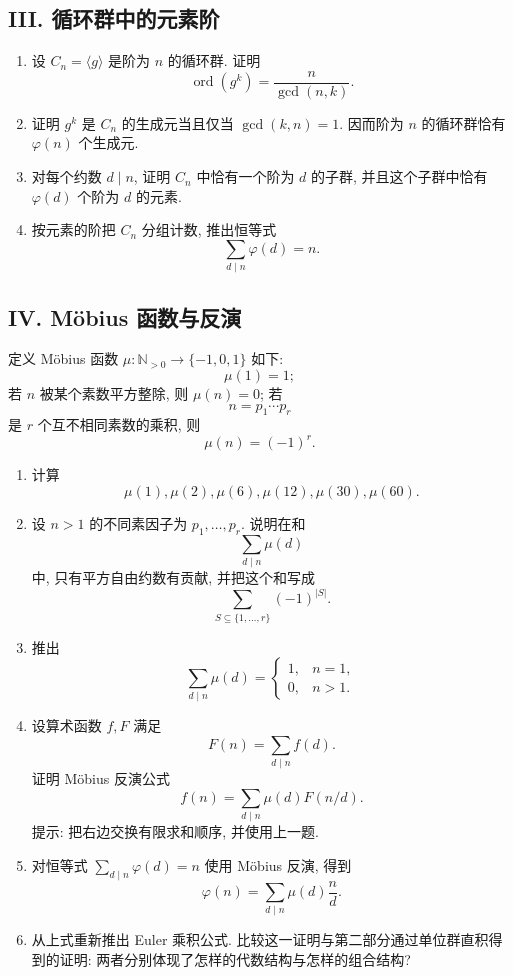 \documentclass[usesamecnt, thmcnt=section, lang=cn, newtx, 10pt, scheme=chinese]{elegantbook}
\begin{document}
\subsection*{III. 循环群中的元素阶}
\begin{enumerate}[label=\textbf{\arabic*.}, resume=alg-comp]
  \item 设 $C_n=\langle g\rangle$ 是阶为 $n$ 的循环群. 证明
  \[
   \operatorname{ord}(g^k)=\frac{n}{\gcd(n,k)}.
  \]
  \item 证明 $g^k$ 是 $C_n$ 的生成元当且仅当 $\gcd(k,n)=1$. 因而阶为 $n$ 的循环群恰有 $\varphi(n)$ 个生成元.
  \item 对每个约数 $d\mid n$, 证明 $C_n$ 中恰有一个阶为 $d$ 的子群, 并且这个子群中恰有 $\varphi(d)$ 个阶为 $d$ 的元素.
  \item 按元素的阶把 $C_n$ 分组计数, 推出恒等式
  \[
   \sum_{d\mid n}\varphi(d)=n.
  \]
\end{enumerate}

\subsection*{IV. Möbius 函数与反演}

定义 Möbius 函数 $\mu:\mathbb N_{>0}\to\{-1,0,1\}$ 如下:
\[
 \mu(1)=1;
\]
若 $n$ 被某个素数平方整除, 则 $\mu(n)=0$; 若
\[
 n=p_1\cdots p_r
\]
是 $r$ 个互不相同素数的乘积, 则
\[
 \mu(n)=(-1)^r.
\]

\begin{enumerate}[label=\textbf{\arabic*.}, resume=alg-comp]
  \item 计算
  \[
   \mu(1),\mu(2),\mu(6),\mu(12),\mu(30),\mu(60).
  \]
  \item 设 $n>1$ 的不同素因子为 $p_1,\ldots,p_r$. 说明在和
  \[
   \sum_{d\mid n}\mu(d)
  \]
  中, 只有平方自由约数有贡献, 并把这个和写成
  \[
   \sum_{S\subseteq\{1,\ldots,r\}}(-1)^{|S|}.
  \]
  \item 推出
  \[
   \sum_{d\mid n}\mu(d)
   =\begin{cases}
   1,&n=1,\\
   0,&n>1.
   \end{cases}
  \]
  \item 设算术函数 $f,F$ 满足
  \[
   F(n)=\sum_{d\mid n}f(d).
  \]
  证明 Möbius 反演公式
  \[
   f(n)=\sum_{d\mid n}\mu(d)F(n/d).
  \]
  提示: 把右边交换有限求和顺序, 并使用上一题.
  \item 对恒等式 $\sum_{d\mid n}\varphi(d)=n$ 使用 Möbius 反演, 得到
  \[
   \varphi(n)=\sum_{d\mid n}\mu(d)\frac nd.
  \]
  \item 从上式重新推出 Euler 乘积公式. 比较这一证明与第二部分通过单位群直积得到的证明: 两者分别体现了怎样的代数结构与怎样的组合结构?
\end{enumerate}
\end{document}
